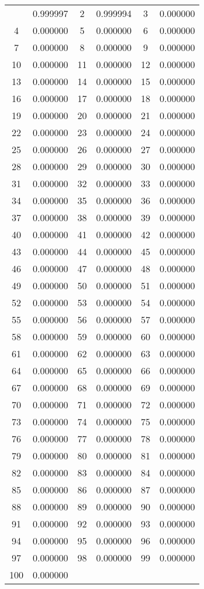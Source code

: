 \documentclass[12pt]{article}
\begin{document}
\begin{longtable}{@{}cc|cc|cc@{}}
\bottomrule
\endlastfoot
1 & 0.999997 & 2 & 0.999994 & 3 & 0.000000 \\
4 & 0.000000 & 5 & 0.000000 & 6 & 0.000000 \\
7 & 0.000000 & 8 & 0.000000 & 9 & 0.000000 \\
10 & 0.000000 & 11 & 0.000000 & 12 & 0.000000 \\
13 & 0.000000 & 14 & 0.000000 & 15 & 0.000000 \\
16 & 0.000000 & 17 & 0.000000 & 18 & 0.000000 \\
19 & 0.000000 & 20 & 0.000000 & 21 & 0.000000 \\
22 & 0.000000 & 23 & 0.000000 & 24 & 0.000000 \\
25 & 0.000000 & 26 & 0.000000 & 27 & 0.000000 \\
28 & 0.000000 & 29 & 0.000000 & 30 & 0.000000 \\
31 & 0.000000 & 32 & 0.000000 & 33 & 0.000000 \\
34 & 0.000000 & 35 & 0.000000 & 36 & 0.000000 \\
37 & 0.000000 & 38 & 0.000000 & 39 & 0.000000 \\
40 & 0.000000 & 41 & 0.000000 & 42 & 0.000000 \\
43 & 0.000000 & 44 & 0.000000 & 45 & 0.000000 \\
46 & 0.000000 & 47 & 0.000000 & 48 & 0.000000 \\
49 & 0.000000 & 50 & 0.000000 & 51 & 0.000000 \\
52 & 0.000000 & 53 & 0.000000 & 54 & 0.000000 \\
55 & 0.000000 & 56 & 0.000000 & 57 & 0.000000 \\
58 & 0.000000 & 59 & 0.000000 & 60 & 0.000000 \\
61 & 0.000000 & 62 & 0.000000 & 63 & 0.000000 \\
64 & 0.000000 & 65 & 0.000000 & 66 & 0.000000 \\
67 & 0.000000 & 68 & 0.000000 & 69 & 0.000000 \\
70 & 0.000000 & 71 & 0.000000 & 72 & 0.000000 \\
73 & 0.000000 & 74 & 0.000000 & 75 & 0.000000 \\
76 & 0.000000 & 77 & 0.000000 & 78 & 0.000000 \\
79 & 0.000000 & 80 & 0.000000 & 81 & 0.000000 \\
82 & 0.000000 & 83 & 0.000000 & 84 & 0.000000 \\
85 & 0.000000 & 86 & 0.000000 & 87 & 0.000000 \\
88 & 0.000000 & 89 & 0.000000 & 90 & 0.000000 \\
91 & 0.000000 & 92 & 0.000000 & 93 & 0.000000 \\
94 & 0.000000 & 95 & 0.000000 & 96 & 0.000000 \\
97 & 0.000000 & 98 & 0.000000 & 99 & 0.000000 \\
100 & 0.000000 &  &  &  &  \\

\end{longtable}
\end{document}

